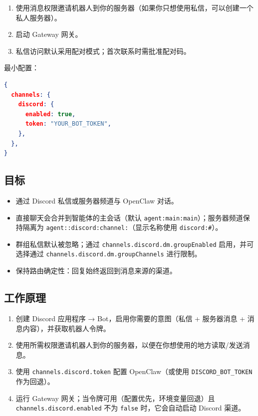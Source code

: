 \begin{enumerate}
  \item 使用消息权限邀请机器人到你的服务器（如果你只想使用私信，可以创建一个私人服务器）。
  \item 启动 Gateway 网关。
  \item 私信访问默认采用配对模式；首次联系时需批准配对码。
\end{enumerate}


最小配置：

\begin{lstlisting}[language=json]
{
  channels: {
    discord: {
      enabled: true,
      token: "YOUR_BOT_TOKEN",
    },
  },
}
\end{lstlisting}


\subsection{目标}


\begin{itemize}
  \item 通过 Discord 私信或服务器频道与 OpenClaw 对话。
  \item 直接聊天会合并到智能体的主会话（默认 \texttt{agent:main:main}）；服务器频道保持隔离为 \texttt{agent::discord:channel:}（显示名称使用 \texttt{discord:\#}）。
  \item 群组私信默认被忽略；通过 \texttt{channels.discord.dm.groupEnabled} 启用，并可选择通过 \texttt{channels.discord.dm.groupChannels} 进行限制。
  \item 保持路由确定性：回复始终返回到消息来源的渠道。
\end{itemize}


\subsection{工作原理}


\begin{enumerate}
  \item 创建 Discord 应用程序 → Bot，启用你需要的意图（私信 + 服务器消息 + 消息内容），并获取机器人令牌。
  \item 使用所需权限邀请机器人到你的服务器，以便在你想使用的地方读取/发送消息。
  \item 使用 \texttt{channels.discord.token} 配置 OpenClaw（或使用 \texttt{DISCORD\_BOT\_TOKEN} 作为回退）。
  \item 运行 Gateway 网关；当令牌可用（配置优先，环境变量回退）且 \texttt{channels.discord.enabled} 不为 \texttt{false} 时，它会自动启动 Discord 渠道。
\end{enumerate}

